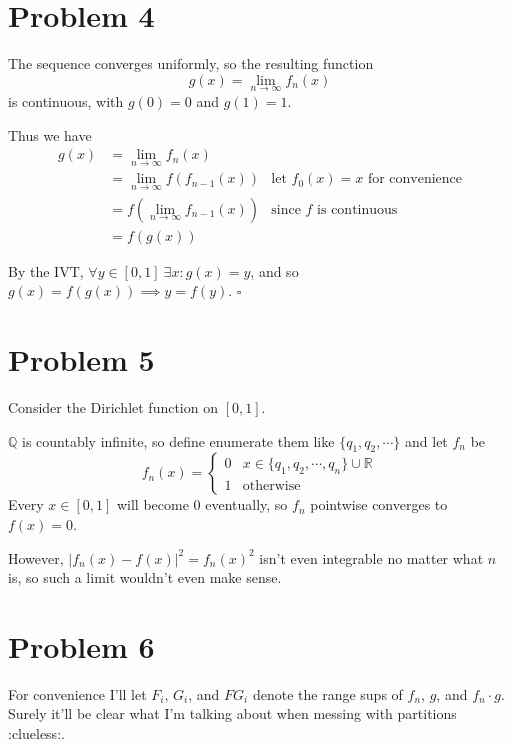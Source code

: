 \documentclass[12pt]{article}
\newcommand{\R}{\mathbb{R}}
\newcommand{\Q}{\mathbb{Q}}
\begin{document}
\pagebreak

\section{Problem 4}

The sequence converges uniformly, so the resulting function
\[g(x)=\lim_{n \to \infty} f_n(x)\]
is continuous, with $g(0)=0$ and $g(1)=1$.

Thus we have
\begin{align*}
  g(x)
   & = \lim_{n \to \infty} f_n(x)                                                                         \\
   & = \lim_{n \to \infty} f(f_{n-1}(x))                          & \text{let $f_0(x)=x$ for convenience} \\
   & = f\left(\lim_{n \to \infty} f_{n-1}(x)\right) & \text{since $f$ is continuous} \\
   &= f(g(x))
\end{align*}

By the IVT, $\forall y \in [0, 1]\ \exists x: g(x)=y$,
and so $g(x)=f(g(x)) \implies y=f(y)$. $\square$

\pagebreak

\section{Problem 5}

Consider the Dirichlet function on $[0, 1]$.

$\Q$ is countably infinite, so define enumerate them like $\{q_1, q_2, \cdots\}$ and let $f_n$ be
\[f_n(x)=\begin{cases}
    0 & x \in \{q_1, q_2, \cdots, q_n\} \cup \R \\
    1 & \text{otherwise}
  \end{cases}\]
Every $x \in [0, 1]$ will become $0$ eventually, so $f_n$ pointwise converges to $f(x)=0$.

However, $|f_n(x)-f(x)|^2=f_n(x)^2$ isn't even integrable no matter what $n$ is,
so such a limit wouldn't even make sense.

\section{Problem 6}

For convenience I'll let $F_i$, $G_i$, and $FG_i$ denote the range sups of $f_n$, $g$, and $f_n \cdot g$.
Surely it'll be clear what I'm talking about when messing with partitions :clueless:.
\end{document}
